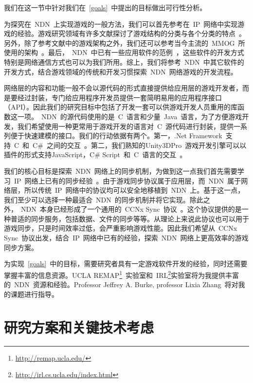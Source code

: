 我们在这一节中针对我们在~\ref{goals}~中提出的目标做出可行性分析。

为探究在~NDN~上实现游戏的一般方法，我们可以首先参考在~IP~网络中实现游戏的经验。游戏研究领域有许多文献探讨了游戏结构的分类与各个分类的特点~\cite{Ferretti2005, Scheating, p2p1, p2p2}。另外，除了参考文献中的游戏架构之外，我们还可以参考当今主流的~MMOG~所使用的架构~\cite{WoW, quake}。最后，~NDN~中已有一些应用软件的范例~\cite{Zact, Zhu2011, andana, vehicle, voccn}，这些软件的开发方式特别是网络通信方式也可以为我们所用。综上，我们将参考~NDN~中其它软件的开发方式，结合游戏领域的传统和开发习惯探索~NDN~网络游戏的开发流程。

网络层的内容和功能一般不会以源代码的形式直接提供给应用层的游戏开发者，而是要经过封装，专门给应用程序开发员提供一套简明易用的应用程序接口（API）。因此我们的研究目标中包括了开发一套可以供游戏开发人员重用的库函数这一项。~NDN~的源代码使用的是~C~语言和少量~Java~语言，为了方便游戏开发，我们希望使用一种更常用于游戏开发的语言对~C~源代码进行封装，提供一系列便于快速建模的接口。我们的行动依据有两个。第一，.Net Framework~支持~C~和~C\#~之间的交互~\cite{interop}。第二，我们熟知的Unity3D{\tm}Pro~游戏开发引擎可以以插件的形式支持JavaScript，C\# Script~和~C~语言的交互~\cite{plugin}。

我们的核心目标是探索~NDN~网络上的同步机制，为做到这一点我们首先需要学习~IP~网络上已有的同步经验~\cite{bryant, chandy, mimaze, hla, lockstep, fixed-bucket, Ferretti2005}。由于游戏同步协议属于应用层，而~NDN~属于网络层，所以传统~IP~网络中的协议均可以安全地移植到~NDN~上。基于这一点，我们至少可以选择一种最适合~NDN~的同步机制并将它实现。除此之外，~NDN~本身已经形成了一个通用的~CCNx Sync~协议~\cite{CCNxSync}。这个协议提供的是一种普适的同步服务，包括数据、文件的同步等等。从理论上来说此协议也可以用于游戏同步，只是时间效率过低，会严重影响游戏性能。因此我们希望从~CCNx Sync~协议出发，结合~IP~网络中已有的经验，探索~NDN~网络上更高效率的游戏同步方案。

为实现~\ref{goals}~中的目标，需要研究者具有一定游戏软件开发的经验，同时还需要掌握丰富的信息资源。UCLA REMAP\footnote{\url{http://remap.ucla.edu/}}~实验室和~IRL\footnote{\url{http://irl.cs.ucla.edu/index.html}}实验室将为我提供丰富的~NDN~资源和经验。Professor Jeffrey A. Burke, professor Lixia Zhang~将对我的课题进行指导。


\section{研究方案和关键技术考虑}

